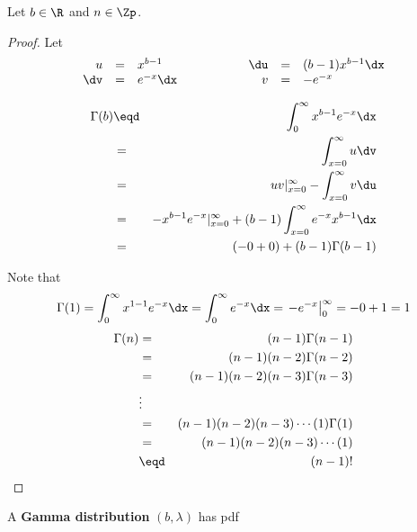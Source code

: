 \begin{proposition}
Let $b\in\R$ and $n\in\Zp$.
\end{proposition}
\begin{proof}
Let
\[\begin{array}{rcl@{\hspace{2cm}}rcl}
  u   &=& x^{b-1}   & \du &=& (b-1)x^{b-1} \dx \\
  \dv &=& e^{-x}\dx & v   &=& -e^{-x}
\end{array}\]

\begin{eqnarray*}
  \Gamma(b)
    &\eqd& \int_0^\infty x^{b-1} e^{-x} \dx  
  \\&=&    \int_{x=0}^\infty u \dv
  \\&=&    uv|_{x=0}^\infty - \int_{x=0}^\infty v \du
  \\&=&    -x^{b-1} e^{-x}|_{x=0}^\infty + (b-1)\int_{x=0}^\infty e^{-x} x^{b-1}\dx
  \\&=&    (-0+0) + (b-1)\Gamma(b-1)
\end{eqnarray*}

Note that 
  \[ \Gamma(1) 
       = \int_0^\infty x^{1-1} e^{-x} \dx
       = \int_0^\infty e^{-x} \dx
       = \left. -e^{-x} \right|_0^\infty 
       = -0 + 1
       = 1
  \]
\begin{eqnarray*}
  \Gamma(n)
    &=& (n-1)\Gamma(n-1)
  \\&=& (n-1)(n-2)\Gamma(n-2)
  \\&=& (n-1)(n-2)(n-3)\Gamma(n-3)
  \\&\vdots& 
  \\&=& (n-1)(n-2)(n-3)\cdots(1)\Gamma(1)
  \\&=& (n-1)(n-2)(n-3)\cdots(1)
  \\&\eqd& (n-1)!
\end{eqnarray*}
\end{proof}

\begin{definition}
A {\bf Gamma distribution} $(b,\lambda)$ has pdf
\end{definition}

